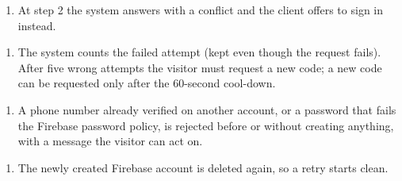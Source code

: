 \begin{enumerate}[nosep,leftmargin=*,label=\textcolor{najdablue}{\bfseries\arabic*.}]
\item At step 2 the system answers with a conflict and the client offers to sign in instead.
\end{enumerate}
\begin{enumerate}[nosep,leftmargin=*,label=\textcolor{najdablue}{\bfseries\arabic*.}]
\item The system counts the failed attempt (kept even though the request fails). After five wrong attempts the visitor must request a new code; a new code can be requested only after the 60-second cool-down.
\end{enumerate}
\begin{enumerate}[nosep,leftmargin=*,label=\textcolor{najdablue}{\bfseries\arabic*.}]
\item A phone number already verified on another account, or a password that fails the Firebase password policy, is rejected before or without creating anything, with a message the visitor can act on.
\end{enumerate}
\begin{enumerate}[nosep,leftmargin=*,label=\textcolor{najdablue}{\bfseries\arabic*.}]
\item The newly created Firebase account is deleted again, so a retry starts clean.
\end{enumerate}


